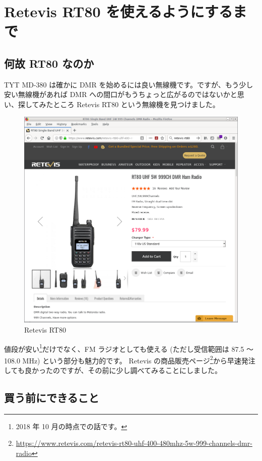 \documentclass[a4j,oneside]{ujbook}
\begin{document}
\appendix
\chapter{Retevis RT80 を使えるようにするまで}

\section{何故 RT80 なのか}

TYT MD-380 は確かに DMR を始めるには良い無線機です。ですが、もう少し安い無線機があれば DMR への間口がもうちょっと広がるのではないかと思い、探してみたところ Retevis RT80 という無線機を見つけました。

\begin{figure}[H]
 \centering
 \includegraphics[width=15cm]{img/rt80-web.png}
 \caption{Retevis RT80}
\end{figure}

値段が安い\footnote{2018 年 10 月の時点での話です。}だけでなく、FM ラジオとしても使える (ただし受信範囲は 87.5 〜 108.0 MHz) という部分も魅力的です。
Retevis の商品販売ページ\footnote{\url{https://www.retevis.com/retevis-rt80-uhf-400-480mhz-5w-999-channels-dmr-radio}}から早速発注しても良かったのですが、その前に少し調べてみることにしました。

\section{買う前にできること}
\end{document}
